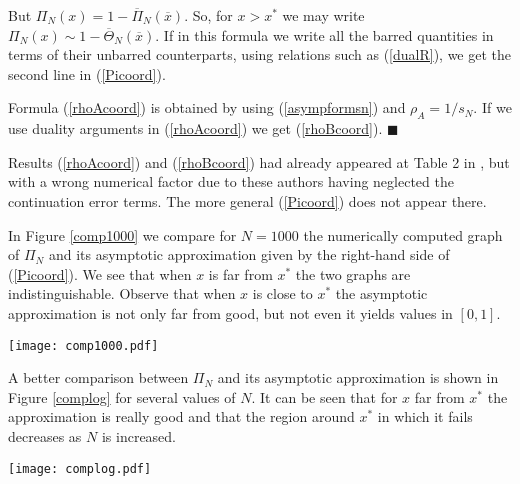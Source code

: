 \documentclass[12pt]{article}
\begin{document}
But $\Pi_N(x)=1-\overline \Pi_N(\overline{x})$. So, for $x>x^{\ast}$ we may write
$\Pi_N(x) \sim 1- \overline \Theta_N(\overline{x})$. If in this formula we write all the barred quantities in terms of their unbarred counterparts, using relations such as (\ref{dualR}), we get the second line in (\ref{Picoord}).

Formula (\ref{rhoAcoord}) is obtained by using (\ref{asympformsn}) and $\rho_A=1/s_N$. If we use duality arguments in (\ref{rhoAcoord}) we get (\ref{rhoBcoord}).
$\blacksquare$

Results (\ref{rhoAcoord}) and (\ref{rhoBcoord}) had already appeared at Table 2 in \cite{AntalScheuring}, but with a wrong  numerical factor due to these authors having neglected the continuation error terms. The more general (\ref{Picoord}) does not appear there.

In Figure \ref{comp1000} we compare for $N=1000$ the numerically computed graph of $\Pi_N$ and its asymptotic approximation given by the right-hand side of (\ref{Picoord}). We see that when $x$ is far from $x^{\ast}$ the two graphs are indistinguishable. Observe that when $x$ is close to $x^{\ast}$ the asymptotic approximation is not only far from good, but not even it yields values in $[0,1]$. 
\begin{figure*}
	\texttt{[image: comp1000.pdf]}
	\caption{Plots of the fixation probability of A as a function of the initial fraction $x$ of A individuals in the population for $N=1000$ (continuous line) and its asymptotic approximation given by the right-hand side of (\ref{Picoord}) (dashed). The pay-off matrix elements are $a=	2.3$, $b=1.89$, $c=2.2$ and $d=2.1$ and the selection intensity is $w=1$. For this particular matrix, the value of $x^{\ast}$ is approximately $0.68$. The invasion scenario is $B\leftarrow \rightarrow A$.}
	\label{comp1000}      %
\end{figure*}

A better comparison between $\Pi_N$ and its asymptotic approximation is shown in Figure \ref{complog} for several values of $N$. It can be seen that for $x$ far from $x^{\ast}$ the approximation is really good and that the region around $x^{\ast}$ in which it fails decreases as $N$ is increased.
\begin{figure*}
	\texttt{[image: complog.pdf]}
	\caption{Plots for several values of $N$ of the absolute difference between the fixation probability of A and its asymptotic approximation given by the right-hand side of (\ref{Picoord}). Notice the logarithmic scale on the vertical axis. The pay-off matrix elements are $a=2.3$, $b= 1.89$, $c=2.2$ and $d=2.1$ and the selection intensity is $w=1$. For this particular matrix, the value of $x^{\ast}$ is approximately $0.68$. The invasion scenario is $B\leftarrow \rightarrow A$.}
	\label{complog}      %
\end{figure*}
\end{document}
